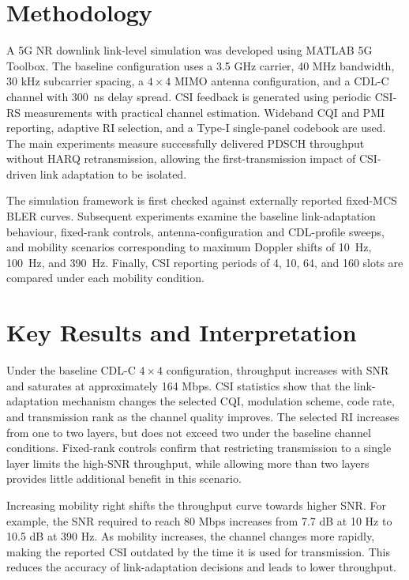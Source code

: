 \documentclass[a4paper,12pt,onecolumn]{article}
\begin{document}
\section*{Methodology}
		A 5G NR downlink link-level simulation was developed using MATLAB 5G Toolbox. The baseline configuration uses a 3.5 GHz carrier, 40 MHz bandwidth, 30 kHz subcarrier spacing, a $4 \times 4$ MIMO antenna configuration, and a CDL-C channel with 300~ns delay spread. CSI feedback is generated using periodic CSI-RS measurements with practical channel estimation. Wideband CQI and PMI reporting, adaptive RI selection, and a Type-I single-panel codebook are used. The main experiments measure successfully delivered PDSCH throughput without HARQ retransmission, allowing the first-transmission impact of CSI-driven link adaptation to be isolated.
		
		The simulation framework is first checked against externally reported fixed-MCS BLER curves. Subsequent experiments examine the baseline link-adaptation behaviour, fixed-rank controls, antenna-configuration and CDL-profile sweeps, and mobility scenarios corresponding to maximum Doppler shifts of 10~Hz, 100~Hz, and 390~Hz. Finally, CSI reporting periods of 4, 10, 64, and 160 slots are compared under each mobility condition.
	\newpage
\thispagestyle{empty}
\section*{Key Results and Interpretation}
		Under the baseline CDL-C $4 \times 4$ configuration, throughput increases with SNR and saturates at approximately 164 Mbps. CSI statistics show that the link-adaptation mechanism changes the selected CQI, modulation scheme, code rate, and transmission rank as the channel quality improves. The selected RI increases from one to two layers, but does not exceed two under the baseline channel conditions. Fixed-rank controls confirm that restricting transmission to a single layer limits the high-SNR throughput, while allowing more than two layers provides little additional benefit in this scenario.
		
		Increasing mobility right shifts the throughput curve towards higher SNR. For example, the SNR required to reach 80 Mbps increases from 7.7 dB at 10 Hz to 10.5 dB at 390 Hz. As mobility increases, the channel changes more rapidly, making the reported CSI outdated by the time it is used for transmission. This reduces the accuracy of link-adaptation decisions and leads to lower throughput.
		
\end{document}

